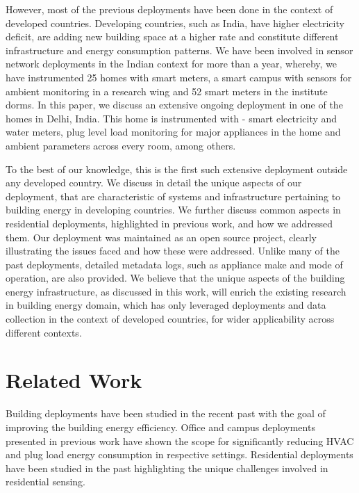 \documentclass[10pt]{sensys-proc}
\begin{document}
However, most of the previous deployments have been done in the context of developed countries. Developing countries, such as India, have higher electricity deficit, are adding new building space at a higher rate and constitute different infrastructure and energy consumption patterns. %
We have been involved in sensor network deployments in the Indian context for more than a year, whereby, we have instrumented 25 homes with smart meters, a smart campus with sensors for ambient monitoring in a research wing and 52 smart meters in the institute dorms. In this paper, we discuss an extensive ongoing deployment in one of the homes in Delhi, India. This home is instrumented with - smart electricity and water meters, plug level load monitoring for major appliances in the home and ambient parameters across every room, among others. 

To the best of our knowledge, this is the first such extensive deployment outside any developed country. We discuss in detail the unique aspects of our deployment, that are characteristic of systems and infrastructure pertaining to building energy in developing countries. We further discuss common aspects in residential deployments, highlighted in previous work, and how we addressed them. Our deployment was maintained as an open source project, clearly illustrating the issues faced and how these were addressed. Unlike many of the past deployments, detailed metadata logs, such as appliance make and mode of operation, are also provided. We believe that the unique aspects of the building energy infrastructure, as discussed in this work, will enrich the existing research in building energy domain, which has only leveraged deployments and data collection in the context of developed countries, for wider applicability across different contexts. 

\section{Related Work}
Building deployments have been studied in the recent past with the goal of improving the building energy efficiency. Office and campus deployments presented in previous work \cite{yuvraj_dashboard,yuvraj_ipsn,batra} have shown the scope for significantly reducing HVAC and plug load energy consumption in respective settings. Residential deployments have been studied in the past highlighting the unique challenges involved in residential sensing.
\end{document}
